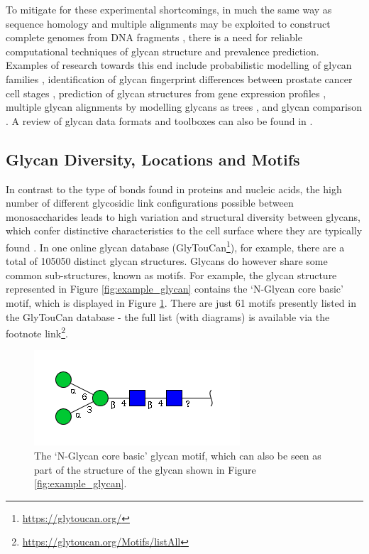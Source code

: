 \documentclass[12pt,a4paper]{article}
\begin{document}
To mitigate for these experimental shortcomings, in much the same way as sequence homology and multiple alignments may be exploited to construct complete genomes from DNA fragments \citep{staden1979strategy}, there is a need for reliable computational techniques of glycan structure and prevalence prediction. Examples of research towards this end include probabilistic modelling of glycan families \citep{ueda2005probabilistic}, identification of glycan fingerprint differences between prostate cancer cell stages \citep{10.1371/journal.pcbi.1002813}, prediction of glycan structures from gene expression profiles \citep{doi:10.1093/bioinformatics/bti666}, multiple glycan alignments by modelling glycans as trees \citep{hosoda2017development}, and glycan comparison \citep{aoki2004score, aoki2004kcam}. A review of glycan data formats and toolboxes can also be found in \citep{campbell2014toolboxes}.



\subsection{Glycan Diversity, Locations and Motifs}
\label{sec:glycan_locations}
In contrast to the type of bonds found in proteins and nucleic acids, the high number of different glycosidic link configurations possible between monosaccharides leads to high variation and structural diversity between glycans, which confer distinctive characteristics to the cell surface where they are typically found \citep{10.1371/journal.pcbi.1002813}.
In one online glycan database (GlyTouCan\footnote{\url{https://glytoucan.org/}}), for example, there are a total of 105050 distinct glycan structures. Glycans do however share some common sub-structures, known as motifs. For example, the glycan structure represented in Figure \ref{fig:example_glycan} contains the `N-Glycan core basic' motif, which is displayed in Figure \ref{fig:N-Glycan core basic}. There are just 61 motifs presently listed in the GlyTouCan database - the full list (with diagrams) is available via the footnote link\footnote{\url{https://glytoucan.org/Motifs/listAll}}.


\begin{figure}[H]
\centering 
\includegraphics[scale=0.8]{images/n-glycan_core_basic.png} 
\caption{The `N-Glycan core basic' glycan motif, which can also be seen as part of the structure of the glycan shown in Figure \ref{fig:example_glycan}.}
\label{fig:N-Glycan core basic}
\end{figure}
\end{document}
